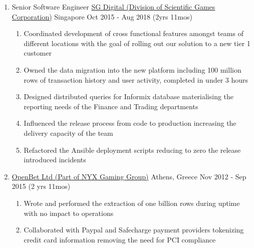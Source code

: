 \documentclass{CVSoftwareEngineer}
\begin{document}
\begin{enumerate}[labelwidth=!, labelindent=0pt, leftmargin=*, rightmargin=15pt]
		\item[] \cvExperience
			{Senior Software Engineer}
			{\href{https://www.sgdigital.com/}{SG Digital (Division of Scientific Games Corporation)}}
			{Singapore}
			{Oct 2015 - Aug 2018 (2yrs 11mos)}
			{
				\begin{enumerate}[labelwidth=!, labelindent=0pt, nosep, leftmargin=*]
					\item[\textasteriskcentered] Coordinated development of cross functional features
						amongst teams of different locations with the goal of rolling out
						our solution to a new tier 1 customer
					\item[\textasteriskcentered] Owned the data migration into the new
						platform including 100 million rows of transaction history and
						user activity, completed in under 3 hours
					\item[\textasteriskcentered] Designed distributed queries for Informix database
						materialising the reporting needs of the Finance and Trading departments
					\item[\textasteriskcentered] Influenced the release process from code to
						production increasing the delivery capacity of the team
					\item[\textasteriskcentered] Refactored the Ansible deployment scripts
						reducing to zero the release introduced incidents
				\end{enumerate}
			}

		\item[]  
			{\href{http://www.openbet.com}{OpenBet Ltd (Part of NYX Gaming Group)}}
			{Athens, Greece}
			{Nov 2012 - Sep 2015 (2 yrs 11mos)}
			{
				\begin{enumerate}[labelwidth=!, labelindent=0pt, nosep, leftmargin=*]
					\item[\textasteriskcentered] Wrote and performed the extraction of
						one billion rows during uptime with no impact to operations
					\item[\textasteriskcentered] Collaborated with Paypal and Safecharge
						payment providers tokenizing credit card information removing
						the need for PCI compliance
				\end{enumerate}
			}
	\end{enumerate}
\end{document}
